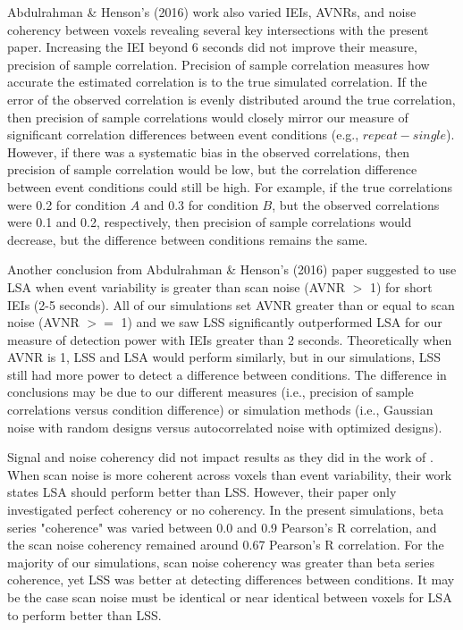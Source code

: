 \documentclass[phd,figures,tables,ackpage,abstractpage,publicabstractpage]{uithesis}
\begin{document}
Abdulrahman \& Henson's (2016) work also varied IEIs, AVNRs, and noise coherency between voxels
revealing several key intersections with the present paper.
Increasing the IEI beyond 6 seconds did not improve their measure, precision of sample correlation.
Precision of sample correlation measures how accurate the estimated correlation is to the true
simulated correlation.
If the error of the observed correlation is evenly distributed around the
true correlation, then precision of sample correlations would closely mirror our measure of
significant correlation differences between event conditions (e.g., $repeat - single$).
However, if there was a systematic bias in the observed correlations, then precision of sample correlation
would be low, but the correlation difference between event conditions could still be high.
For example, if the true correlations were 0.2 for condition $A$ and 0.3 for condition $B$, but
the observed correlations were 0.1 and 0.2, respectively, then precision of sample correlations would
decrease, but the difference between conditions remains the same.

Another conclusion from Abdulrahman \& Henson's (2016) paper suggested to
use LSA when event variability is greater than scan noise (AVNR $>$ 1) for short IEIs (2-5 seconds).
All of our simulations set AVNR greater than or equal to scan noise (AVNR $>=$ 1) and we saw
LSS significantly outperformed LSA for our measure of detection power with IEIs greater than 2 seconds.
Theoretically when AVNR is 1, LSS and LSA would perform similarly, but in our simulations,
LSS still had more power to detect a difference between conditions.
The difference in conclusions may be due to our different measures (i.e., precision of sample correlations versus condition difference)
or simulation methods (i.e., Gaussian noise with random designs versus autocorrelated noise with optimized designs).

Signal and noise coherency did not impact results as they did in the work of \cite[Abdulrahman \& Henson (2016)]{Abdulrahman2016}.
When scan noise is more coherent across voxels than event variability,
their work states LSA should perform better than LSS.
However, their paper only investigated perfect coherency or no coherency.
In the present simulations, beta series "coherence" was varied between 0.0 and 0.9 Pearson's R correlation,
and the scan noise coherency remained around 0.67 Pearson's R correlation.
For the majority of our simulations, scan noise coherency was greater than beta series
coherence, yet LSS was better at detecting differences between conditions.
It may be the case scan noise must be identical or near identical between voxels
for LSA to perform better than LSS.
\end{document}
